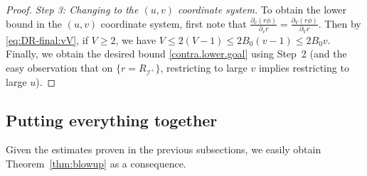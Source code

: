 \documentclass[10pt, reqno]{amsart}
\theoremstyle{definition}
\theoremstyle{remark}
\theoremstyle{conjecture}
\numberwithin{equation}{section}
\newcommand{\rd}{\partial}
\newcommand{\0}{\emptyset}
\newcommand{\calI}{\mathcal I}
\newcommand{\f}{\frac}
\newcommand{\pfstep}[1]{\vspace{.5em} {\it \noindent #1.}}
\begin{document}
\begin{proof}
\pfstep{Step 3: Changing to the $(u,v)$ coordinate system} 
To obtain the lower bound in the $(u,v)$ coordinate system, first note that $\f{\rd_v(r\phi)}{\rd_v r}=\f{\rd_V(r\phi)}{\rd_V r}$. Then by \eqref{eq:DR-final:vV}, if $V\geq 2$, we have $V\leq 2 (V-1)\leq 2 B_0(v-1)\leq 2 B_0 v$. Finally, we obtain the desired bound \eqref{contra.lower.goal} using Step~2 (and the easy observation that on $\{r=R_{\calI^+}\}$, restricting to large $v$ implies restricting to large $u$). \qedhere
\end{proof}

\subsection{Putting everything together}\label{sec.contra.conclude}

Given the estimates proven in the previous subsections, we easily obtain Theorem~\ref{thm:blowup} as a consequence.
\end{document}
